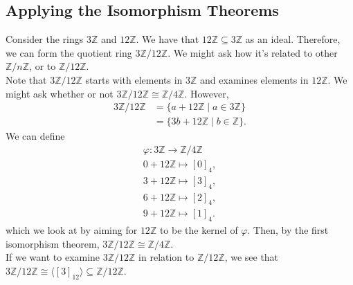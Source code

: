 \documentclass[10pt]{extarticle}
\newcommand{\Z}{\mathbb{Z}}
\begin{document}
  \subsection{Applying the Isomorphism Theorems}%
  Consider the rings $3\Z$ and $12\Z$. We have that $12\Z \subseteq 3\Z$ as an ideal. Therefore, we can form the quotient ring $3\Z/12\Z$. We might ask how it's related to other $\Z/n\Z$, or to $\Z/12\Z$.\\

  Note that $3\Z/12\Z$ starts with elements in $3\Z$ and examines elements in $12\Z$. We might ask whether or not $3\Z/12\Z \cong \Z/4\Z$. However,
  \begin{align*}
    3\Z/12\Z &= \{a + 12\Z\mid a\in 3\Z\}\\
             &= \{3b + 12\Z \mid b\in\Z\}.
  \end{align*}
  We can define 
  \begin{align*}
    \varphi: 3\Z\rightarrow \Z/4\Z\\
    0 + 12\Z \mapsto [0]_4,\\
    3 + 12\Z \mapsto [3]_4,\\
    6 + 12\Z \mapsto [2]_4,\\
    9 + 12\Z \mapsto [1]_4.
  \end{align*}
  which we look at by aiming for $12\Z$ to be the kernel of $\varphi$. Then, by the first isomorphism theorem, $3\Z/12\Z \cong \Z/4\Z$.\\

  If we want to examine $3\Z/12\Z$ in relation to $\Z/12\Z$, we see that $3\Z/12\Z \cong \langle[3]_{12}\rangle \subseteq \Z/12\Z$.
\end{document}
